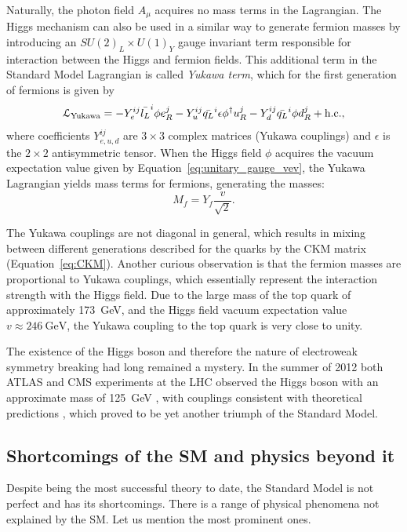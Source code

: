 Naturally, the photon field $A_\mu$ acquires no mass terms in the Lagrangian. The Higgs mechanism can also be used in a
similar way to generate fermion masses by introducing an $SU(2)_L \times U(1)_Y$ gauge invariant term responsible for
interaction between the Higgs and fermion fields. This additional term in the Standard Model Lagrangian is called
\textit{Yukawa term}, which for the first generation of fermions is given by
\begin{equation}
\mathcal{L}_\textrm{Yukawa} = -Y_e^{ij} \bar{l_L}^i \phi e_R^j - Y_u^{ij} \bar{q_L}^i \epsilon \phi^\dag u_R^j - Y_d^{ij}
\bar{q_L}^i \phi d_R^j + \textrm{h.c.},
\end{equation}
where coefficients $Y_{e,u,d}^{ij}$ are $3\times3$ complex matrices (Yukawa couplings) and $\epsilon$ is the $2\times2$
antisymmetric tensor. When the Higgs field $\phi$ acquires the vacuum expectation value given by
Equation~\ref{eq:unitary_gauge_vev}, the Yukawa Lagrangian yields mass terms for fermions, generating the masses:
\begin{equation}
M_f = Y_f \frac{v}{\sqrt{2}}.
\end{equation}

The Yukawa couplings are not diagonal in general, which results in mixing between different generations described for
the quarks by the CKM matrix (Equation~\ref{eq:CKM}). Another curious observation is that the fermion masses are
proportional to Yukawa couplings, which essentially represent the interaction strength with the Higgs field. Due to the
large mass of the top quark of approximately \SI{173}{\GeV}, and the Higgs field vacuum expectation value
$v\approx\SI{246}{\GeV}$, the Yukawa coupling to the top quark is very close to unity.

The existence of the Higgs boson and therefore the nature of electroweak symmetry breaking had long remained a mystery.
In the summer of 2012 both ATLAS and CMS experiments at the LHC observed the Higgs boson with an approximate mass of
\SI{125}{\GeV} \autocite{ATLAS_higgs_observation, CMS_higgs_observation}, with couplings consistent with theoretical
predictions \autocite{CMS_Higgs_long_paper, ATLAS_Higgs_couplings}, which proved to be yet another triumph of the
Standard Model.

\newpage
\subsection{Shortcomings of the SM and physics beyond it}
\label{ss:SM_shortcomings}
Despite being the most successful theory to date, the Standard Model is not perfect and has its shortcomings. There is a
range of physical phenomena not explained by the SM. Let us mention the most prominent ones.

